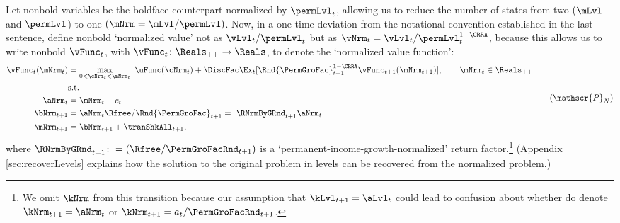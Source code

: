 \documentclass[\econtexRoot/BufferStockTheory]{subfiles}
\begin{document}
Let nonbold variables be the boldface counterpart normalized by $\permLvl_{t}$, allowing us to reduce the number of states from two ($\mLvl$ and $\permLvl$) to one $(\mNrm = \mLvl/\permLvl)$.
Now, in a one-time deviation from the notational convention established in the last sentence, define nonbold `normalized value' not as $\vLvl_{t}/\permLvl_{t}$ but as $\vNrm_{t} = \vLvl_{t}/\permLvl_{t}^{1-\CRRA}$, because this allows us to write nonbold $\vFunc_{t}$, with $\vFunc_{t}\colon \Reals_{++}\rightarrow \Reals$, to denote the `normalized value function':
%
%
\begin{equation}\label{eq:veqnNrmRecBellman}
  \begin{aligned}
    \vFunc_{t}(\mNrm_{t})  & = \max_{0<\cNrm_{t}< \mNrm_{t}}~  \uFunc(\cNrm_{t}) +\DiscFac \Ex_{t}[\Rnd{\PermGroFac}_{t+1}^{1-\CRRA}\vFunc_{t+1}({\mNrm}_{t+1})],\qquad  \mNrm_{t}\in \Reals_{++}\\
    & \mbox{s.t.}
    \\ {\aNrm}_{t}  & = \mNrm_{t}-c_{t}
    \\ {\bNrm}_{t+1} & = \aNrm_{t} \Rfree/\Rnd{\PermGroFac}_{t+1} = ~  \RNrmByGRnd_{t+1}\aNrm_{t} %
    \\ \mNrm_{t+1}  & = \bNrm_{t+1} +\tranShkAll_{t+1} ,
  \end{aligned}  \tag{$\mathscr{P}_{N}$}
\end{equation}
where $\RNrmByGRnd_{t+1}\colon = (\Rfree/\PermGroFacRnd_{t+1})$ is a `permanent-income-growth-normalized' return factor.\footnote{We omit $\kNrm$ from this transition because our assumption that $\kLvl_{t+1}=\aLvl_{t}$ could lead to confusion about whether do denote $\kNrm_{t+1}=\aNrm_{t}$ or $\kNrm_{t+1}=a_{t}/\PermGroFacRnd_{t+1}$.} %
(Appendix \ref{sec:recoverLevels} explains how the solution to the original problem in levels can be recovered from the normalized problem.)
\end{document}
